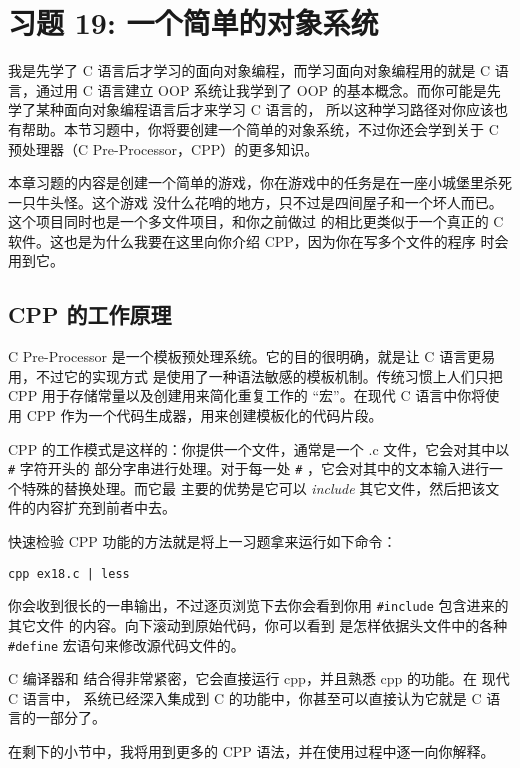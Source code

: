 \chapter{习题 19: 一个简单的对象系统}

我是先学了 C 语言后才学习的面向对象编程，而学习面向对象编程用的就是 C 语言，通过用 C 语言建立 
OOP 系统让我学到了 OOP 的基本概念。而你可能是先学了某种面向对象编程语言后才来学习 C 语言的，
所以这种学习路径对你应该也有帮助。本节习题中，你将要创建一个简单的对象系统，不过你还会学到关于 C 
预处理器（C Pre-Processor，CPP）的更多知识。

本章习题的内容是创建一个简单的游戏，你在游戏中的任务是在一座小城堡里杀死一只牛头怪。这个游戏
没什么花哨的地方，只不过是四间屋子和一个坏人而已。这个项目同时也是一个多文件项目，和你之前做过
的相比更类似于一个真正的 C 软件。这也是为什么我要在这里向你介绍 CPP，因为你在写多个文件的程序
时会用到它。

\section{CPP 的工作原理}

C Pre-Processor 是一个模板预处理系统。它的目的很明确，就是让 C 语言更易用，不过它的实现方式
是使用了一种语法敏感的模板机制。传统习惯上人们只把 CPP 用于存储常量以及创建用来简化重复工作的
“宏”。在现代 C 语言中你将使用 CPP 作为一个代码生成器，用来创建模板化的代码片段。

CPP 的工作模式是这样的：你提供一个文件，通常是一个 .c 文件，它会对其中以 \verb|#| 字符开头的
部分字串进行处理。对于每一处 \verb|#| ，它会对其中的文本输入进行一个特殊的替换处理。而它最
主要的优势是它可以 \emph{include} 其它文件，然后把该文件的内容扩充到前者中去。

快速检验 CPP 功能的方法就是将上一习题拿来运行如下命令：

\begin{Verbatim}
cpp ex18.c | less
\end{Verbatim}

你会收到很长的一串输出，不过逐页浏览下去你会看到你用 \verb|#include| 包含进来的其它文件
的内容。向下滚动到原始代码，你可以看到  是怎样依据头文件中的各种 \verb|#define| 
宏语句来修改源代码文件的。

C 编译器和  结合得非常紧密，它会直接运行 cpp，并且熟悉 cpp 的功能。在
现代 C 语言中， 系统已经深入集成到 C 的功能中，你甚至可以直接认为它就是 C 
语言的一部分了。

在剩下的小节中，我将用到更多的 CPP 语法，并在使用过程中逐一向你解释。


